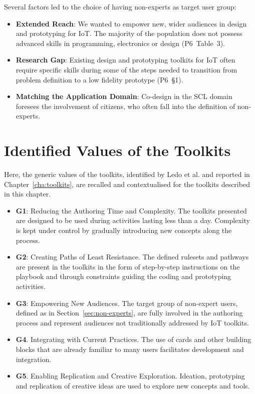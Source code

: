 Several factors led to the choice of having non-experts as target user group:

\begin{itemize}
    \item \textbf{Extended Reach}: We wanted to empower new, wider audiences in design and prototyping for IoT. The majority of the population does not possess advanced skills in programming, electronics or design (P6~Table~3).
    \item \textbf{Research Gap}: Existing design and prototyping toolkits for IoT often require specific skills during some of the steps needed to transition from problem definition to a low fidelity prototype (P6~\S1).
    \item \textbf{Matching the Application Domain}: Co-design in the SCL domain foresees the involvement of citizens, who often fall into the definition of non-experts.
\end{itemize}


\section{Identified Values of the Toolkits}

Here, the generic values of the toolkits, identified by Ledo et al. \autocite*{ledo_evaluation_2018} and reported in Chapter~\ref{cha:toolkits}, are recalled and contextualised for the toolkits described in this chapter.

\begin{itemize}
    \item \textbf{G1}: Reducing the Authoring Time and Complexity. The toolkits presented are designed to be used during activities lasting less than a day. Complexity is kept under control by gradually introducing new concepts along the process.
    \item \textbf{G2}: Creating Paths of Least Resistance. The defined rulesets and pathways are present in the toolkits in the form of step-by-step instructions on the playbook and through constraints guiding the coding and prototyping activities.
    \item \textbf{G3}: Empowering New Audiences. The target group of non-expert users, defined as in Section~\ref{sec:non-experts}, are fully involved in the authoring process and represent audiences not traditionally addressed by IoT toolkits.
    \item \textbf{G4}. Integrating with Current Practices. The use of cards and other building blocks that are already familiar to many users facilitates development and integration.
    \item \textbf{G5}. Enabling Replication and Creative Exploration. Ideation, prototyping and replication of creative ideas are used to explore new concepts and tools.
\end{itemize}


